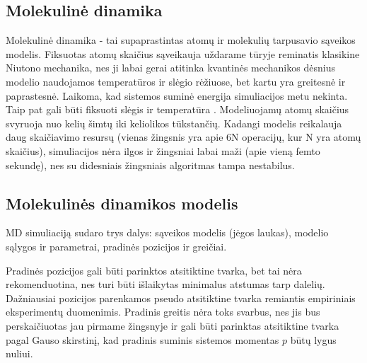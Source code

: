 \subsection{Molekulinė dinamika}
\label{sec:molecular_dynamics}


Molekulinė dinamika - tai supaprastintas atomų ir molekulių tarpusavio sąveikos modelis.
Fiksuotas atomų skaičius sąveikauja uždarame tūryje reminatis klasikine Niutono mechanika,
nes ji labai gerai atitinka kvantinės mechanikos dėsnius modelio naudojamos temperatūros ir slėgio rėžiuose,
bet kartu yra greitesnė ir paprastesnė.
Laikoma, kad sistemos suminė energija simuliacijos metu nekinta.
Taip pat gali būti fiksuoti slėgis ir temperatūra \cite{hitch}.
Modeliuojamų atomų skaičius svyruoja nuo kelių šimtų iki keliolikos tūkstančių.
Kadangi modelis reikalauja daug skaičiavimo resursų (vienas žingsnis yra apie 6N operacijų, kur N yra atomų skaičius),
simuliacijos nėra ilgos ir žingsniai labai maži (apie vieną femto sekundę), nes su didesniais žingsniais algoritmas tampa nestabilus.


\subsection{Molekulinės dinamikos modelis}
\label{sec:molecular_dynamics_model}


MD simuliaciją sudaro trys dalys: sąveikos modelis (jėgos laukas), modelio sąlygos ir parametrai, pradinės pozicijos ir greičiai.

Pradinės pozicijos gali būti parinktos atsitiktine tvarka, bet tai nėra rekomenduotina, nes turi būti išlaikytas minimalus atstumas tarp dalelių.
Dažniausiai pozicijos parenkamos pseudo atsitiktine tvarka remiantis empiriniais eksperimentų duomenimis.
Pradinis greitis nėra toks svarbus, nes jis bus perskaičiuotas jau pirmame žingsnyje ir gali būti parinktas atsitiktine tvarka pagal Gauso skirstinį,
kad pradinis suminis sistemos momentas \(p\) būtų lygus nuliui.


